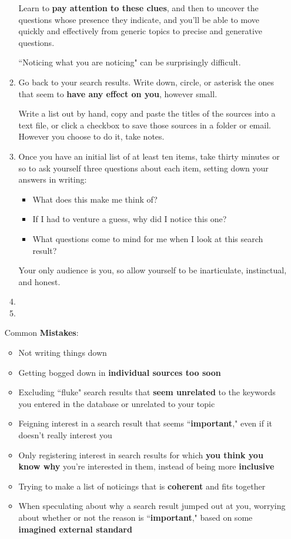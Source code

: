 \documentclass[11pt]{article}
\begin{document}
\begin{itemize}
\begin{exercise}
\begin{enumerate}
Learn to \textbf{pay attention to these clues}, and then to uncover the questions whose presence they indicate, and you’ll be able to move quickly and effectively from generic topics to precise and generative questions.

``Noticing what you are noticing" can be surprisingly difficult. 

\item Go back to your search results. Write down, circle, or asterisk the ones that seem to \textbf{have any effect on you}, however small. 

Write a list out by hand, copy and paste the titles of the sources into a text file, or click a checkbox to save those sources in a folder or email. However you choose to do it, take notes.

\item  Once you have an initial list of at least ten items, take thirty minutes or so to ask yourself three questions
about each item, setting down your answers in writing:
\begin{itemize}
\item What does this make me think of?
\item  If I had to venture a guess, why did I notice this one?
\item  What questions come to mind for me when I look at this search result?
\end{itemize} 

Your only audience is you, so allow yourself to be inarticulate, instinctual, and honest.

\item 
\item  
\end{enumerate}

Common \textbf{Mistakes}:
\begin{itemize}
\item Not writing things down
\item Getting bogged down in \textbf{individual sources too soon}
\item Excluding ``fluke" search results that \textbf{seem unrelated} to the keywords you entered in the database or unrelated to your topic
\item Feigning interest in a search result that seems ``\textbf{important}," even if it doesn’t really interest you
\item Only registering interest in search results for which \textbf{you think you know why} you’re interested in them, instead of being more \textbf{inclusive}
\item Trying to make a list of noticings that is \textbf{coherent} and fits together
\item When speculating about why a search result jumped out at you, worrying about whether or not the reason is ``\textbf{important}," based on some \textbf{imagined external standard}
\end{itemize}
\end{exercise}


\end{itemize}
\end{document}
